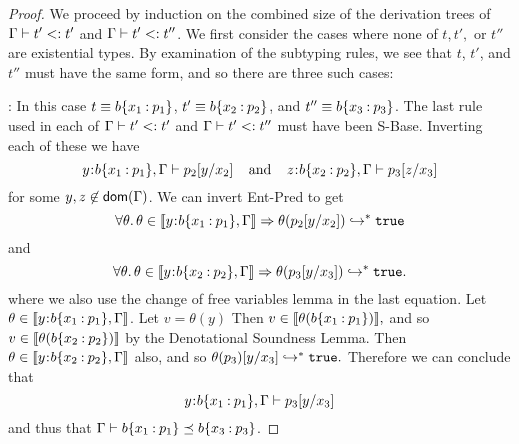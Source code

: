 \begin{proof}
    We proceed by induction on the combined size of the derivation trees of $\mathrm{\Gamma} \vdash t' <: t'$ and $\mathrm{\Gamma} \vdash t' <: t''$.
    We first consider the cases where none of $t, t',$ or $t''$ are existential types. By examination of the subtyping rules, we see that $t$, $t'$, and $t''$ must have the same form, and so there are three such cases:
    
    : 
    In this case $t \equiv b\{x_1\mathbin{:} p_1\}$, $t' \equiv b\{x_2\mathbin{:} p_2\}$, and $t'' \equiv b\{x_3\mathbin{:} p_3\}$. The last rule used in each of $\mathrm{\Gamma} \vdash t' <: t'$ and $\mathrm{\Gamma} \vdash t' <: t''$ must have been {\sc S-Base}. Inverting each of these we have
    \begin{equation}
    {y\hspace{0.05em}{:}\hspace{0.05em}b\{x_1\mathbin{:}p_1\}, \mathrm{\Gamma}} \vdash {p_2[y/x_2]} \;\;\;\;{\rm and}\;\;\;\; {z\hspace{0.05em}{:}\hspace{0.05em} b\{x_2\mathbin{:} p_2\}, \mathrm{\Gamma}} \vdash {p_3[z/x_3]}
    \end{equation}
    for some $y,z \not\in{\mathsf{dom}}(\mathrm{\Gamma})$. We can invert {\sc Ent-Pred}  to get
    \begin{equation}
    \forall \theta.\, \theta \in\llbracket y\hspace{0.05em}{:}\hspace{0.05em} b\{x_1\mathbin{:} p_1\}, \mathrm{\Gamma}\rrbracket \Rightarrow \theta(p_2[y/x_2]) \hookrightarrow^{*} \mathtt{true}
    \end{equation}and\begin{equation}
    \forall \theta.\, \theta \in\llbracket y\hspace{0.05em}{:}\hspace{0.05em} b\{x_2\mathbin{:} p_2\}, \mathrm{\Gamma}\rrbracket \Rightarrow \theta(p_3[y/x_3]) \hookrightarrow^{*} \mathtt{true}.
    \end{equation}
    where we also use the change of free variables lemma in the last equation.
    Let $\theta \in\llbracket y\hspace{0.05em}{:}\hspace{0.05em} b\{x_1\mathbin{:} p_1\}, \mathrm{\Gamma}\rrbracket$. 
    Let $v = \theta(y)$ Then $v \in \llbracket \theta(b\{x_1\mathbin{:} p_1\})\rrbracket,$ and so $v \in \llbracket \theta(b\{x_2\mathbin{:} p_2\})\rrbracket$ by the Denotational Soundness Lemma. Then $\theta \in\llbracket y\hspace{0.05em}{:}\hspace{0.05em} b\{x_2\mathbin{:} p_2\}, \mathrm{\Gamma}\rrbracket$ also, and so 
    $\theta(p_3)[y/x_3] \hookrightarrow^{*} \mathtt{true}.$
    Therefore we can conclude that
    \begin{equation}
        {y\hspace{0.05em}{:}\hspace{0.05em}b\{x_1\mathbin{:}p_1\}, \mathrm{\Gamma}} \vdash {p_3[y/x_3]}
    \end{equation} 
    and thus that ${\mathrm{\Gamma}} \vdash b\{x_1\mathbin{:} p_1\} \preceq b\{x_3\mathbin{:} p_3\}$.
    

\end{proof}
